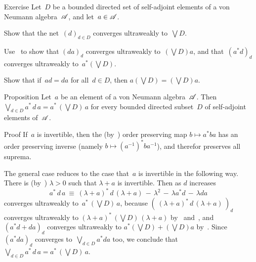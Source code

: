 \documentclass[main]{subfiles}
\begin{document}
\begin{parsec}%
\begin{point}{Exercise}
Let~$D$ be a bounded directed set of self-adjoint
elements of a von Neumann algebra~$\mathscr{A}$,
and let~$a\in \mathscr{A}$.
\begin{point}%
Show that the net~$(d)_{d\in D}$ converges ultraweakly to~$\bigvee D$.
\end{point}
\begin{point}%
Use~
to show that $(da)_d$ converges ultraweakly to~$(\bigvee D)a$,
and that~$(a^*d)_d$ converges ultraweakly to~$a^* (\bigvee D)$.
\end{point}
\begin{point}%
Show that if~$ad=da$ for all~$d\in D$,
then $a(\bigvee D) = (\bigvee D)a $.
\end{point}
\end{point}
\end{parsec}
%
%
\begin{parsec}[ad-normal]%
\begin{point}{Proposition}%
Let~$a$ be an element of a von Neumann algebra~$\mathscr{A}$.
Then~$\bigvee_{d\in D} a^*\,d\,a = a^*\,(\bigvee D)\, a$
for every bounded directed subset~$D$ of self-adjoint
elements of~$\mathscr{A}$.
\end{point}
\begin{point}[ad-normal-1]{Proof}%
If~$a$ is invertible,
then the (by~) order preserving map $b\mapsto a^*ba$
has an order preserving inverse (namely $b\mapsto (a^{-1})^* b a^{-1}$),
and therefor preserves all suprema.
\begin{point}%
The general case reduces to the case that~$a$ 
is invertible
in the following way.
There is (by~)
 $\lambda>0$ such that $\lambda+a$ is invertible.
Then as $d$ increases 
\begin{equation*}
a^*\,d\,a \ \equiv\  (\lambda+a)^*\,d\,(\lambda+a) \,-\,
 \lambda^2 \,-\, \lambda a^*d \,-\, \lambda da
\end{equation*}
converges ultraweakly
to~$a^* \,(\bigvee D)\,a$,
because $(\ (\lambda+a)^*\,d\,(\lambda+a)\ )_d$
converges ultraweakly to $(\lambda+a)^*\,(\bigvee D)\,(\lambda+a)$
by~ and~,
and $(a^*d+da)_d$ converges ultraweakly to $a^*(\bigvee D)+(\bigvee D)a$
by~.
Since~$(a^*da)_d$ converges to~$\bigvee_{d\in D} a^*d a$ too,
we conclude that~$\bigvee_{d\in D} a^* \,d\, a = a^*\,(\bigvee D)\,a$.
\end{point}
\end{point}
\end{parsec}
\end{document}
